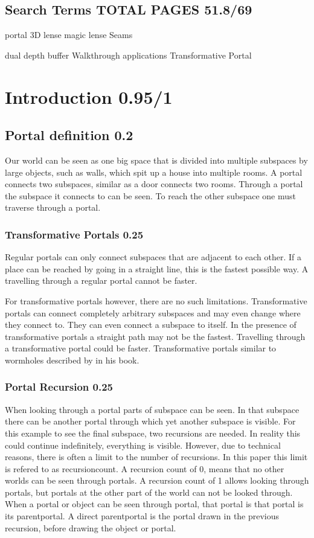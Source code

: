 
\subsection*{Search Terms TOTAL PAGES 51.8/69}
portal
3D lense
magic lense
Seams

dual depth buffer
Walkthrough applications
Transformative Portal
\section{Introduction 0.95/1}

\subsection{Portal definition 0.2}
Our world can be seen as one big space that is divided into multiple subspaces by large objects, such as walls, which spit up a house into multiple rooms. A portal connects two subspaces, similar as a door connects two rooms. Through a portal the subspace it connects to can be seen. To reach the other subspace one must traverse through a portal.

\subsubsection{Transformative Portals 0.25}
Regular portals can only connect subspaces that are adjacent to each other. If a place can be reached by going in a straight line, this is the fastest possible way. A travelling through a regular portal cannot be faster.

For transformative portals however, there are no such limitations. Transformative portals can connect completely arbitrary subspaces and may even change where they connect to. They can even connect a subspace to itself. In the presence of transformative portals a straight path may not be the fastest. Travelling through a transformative portal could be faster. Transformative portals similar to wormholes described by \textcite{Visser:Wormholes} in his book.

\subsubsection{Portal Recursion 0.25}
When looking through a portal parts of subspace can be seen. In that subspace there can be another portal through which yet another subspace is visible. For this example to see the final subspace, two recursions are needed. In reality this could continue indefinitely, everything is visible. However, due to technical reasons, there is often a limit to the number of recursions. In this paper this limit is refered to as \gls{recursioncount}. A recursion count of 0, means that no other worlds can be seen through portals. A recursion count of 1 allows looking through portals, but portals at the other part of the world can not be looked through. When a portal or object can be seen through portal, that portal is that portal is its \gls{parentportal}. A direct \gls{parentportal} is the portal drawn in the previous recursion, before drawing the object or portal.

